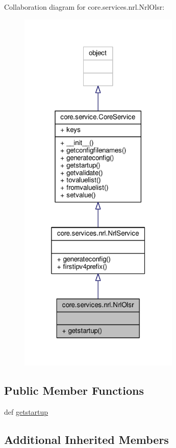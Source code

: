 Collaboration diagram for core.\+services.\+nrl.\+Nrl\+Olsr\+:
\nopagebreak
\begin{figure}[H]
\begin{center}
\leavevmode
\includegraphics[width=217pt]{classcore_1_1services_1_1nrl_1_1_nrl_olsr__coll__graph}
\end{center}
\end{figure}
\subsection*{Public Member Functions}
\begin{DoxyCompactItemize}
\item 
def \hyperlink{classcore_1_1services_1_1nrl_1_1_nrl_olsr_a9b3073d6c9d8b815d6799eccde274d85}{getstartup}
\end{DoxyCompactItemize}
\subsection*{Additional Inherited Members}



